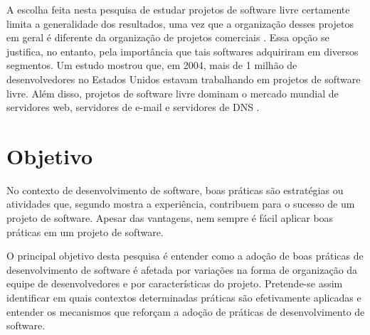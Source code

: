 \documentclass{article}
\begin{document}
A escolha feita nesta pesquisa de estudar projetos de software livre certamente
limita a generalidade dos resultados, uma vez que a organização desses projetos
em geral é diferente da organização de projetos comerciais \cite{raymond2001}.
Essa opção se justifica, no entanto, pela importância que tais softwares
adquiriram em diversos segmentos.  Um estudo mostrou que, em 2004, mais de 1
milhão de desenvolvedores no Estados Unidos estavam trabalhando em projetos de
software livre. Além disso, projetos de software livre dominam o mercado mundial
de servidores web, servidores de e-mail e servidores de DNS \cite{wheeler2007}.






\section{Objetivo}

No contexto de desenvolvimento de software, boas práticas são estratégias ou
atividades que, segundo mostra a experiência, contribuem para o sucesso de um
projeto de software. Apesar das vantagens, nem sempre é fácil aplicar boas
práticas em um projeto de software. %

O principal objetivo desta pesquisa é entender como a adoção de boas práticas de
desenvolvimento de software é afetada por variações na forma de organização da
equipe de desenvolvedores e por características do projeto. Pretende-se assim
identificar em quais contextos determinadas práticas são efetivamente aplicadas
e entender os mecanismos que reforçam a adoção de práticas de desenvolvimento de
software.
\end{document}
